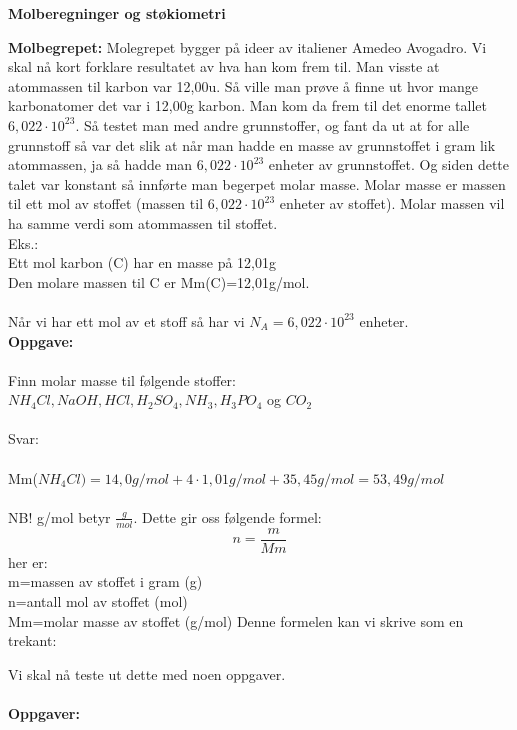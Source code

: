 \documentclass[12pt,a4paper]{article}
\author{Svein-Tore Narvestad}
\date{September 2025}
\begin{document}
\begin{center}
    \textbf{\large Molberegninger og støkiometri}
\end{center}
\textbf{Molbegrepet:}
Molegrepet bygger på ideer  av italiener Amedeo Avogadro.  Vi skal nå kort forklare resultatet av hva han kom frem til. Man visste at atommassen til karbon var 12,00u.  Så ville man prøve å finne ut hvor mange karbonatomer det var i 12,00g karbon.  Man kom da frem til det enorme tallet $6,022\cdot 10^{23}$.  Så testet man med andre grunnstoffer, og fant da ut at for alle grunnstoff så var det slik at når man hadde en masse av grunnstoffet i gram lik atommassen, ja så hadde man $6,022\cdot 10^{23}$ enheter av grunnstoffet.  Og siden dette talet var konstant så innførte man begerpet molar masse.
Molar masse er massen til ett mol av stoffet (massen til $6,022\cdot 10^{23}$ enheter av stoffet).  Molar massen vil ha samme verdi som atommassen til stoffet.  \\
Eks.:\\
Ett mol karbon (C) har en masse på 12,01g\\
Den molare massen til C er  Mm(C)=12,01g/mol.\\\\
Når vi har ett mol av et stoff så har vi $N_A=6,022\cdot 10^{23}$ enheter.\\

\noindent\textbf{Oppgave:}\\\\
Finn molar masse til følgende stoffer:\\

$NH_4Cl, NaOH, HCl, H_2SO_4, NH_3,H_3PO_4$ og $CO_2$\\\\
Svar:\\\\
Mm($NH_4Cl)=14,0g/mol+4\cdot 1,01g/mol+35,45g/mol=53,49g/mol$\\\\
NB! g/mol betyr $\frac{g}{mol}$.  Dette gir oss følgende formel:
$$n=\frac{m}{Mm}$$
her er:\\
m=massen av stoffet i gram (g)\\
n=antall mol av stoffet (mol)\\
Mm=molar masse av stoffet (g/mol)\newpage
Denne formelen kan vi skrive som en trekant:\\
\begin{center}
\end{center}
Vi skal nå teste ut dette med noen oppgaver.\\\\
\textbf{Oppgaver:}\\
\end{document}
